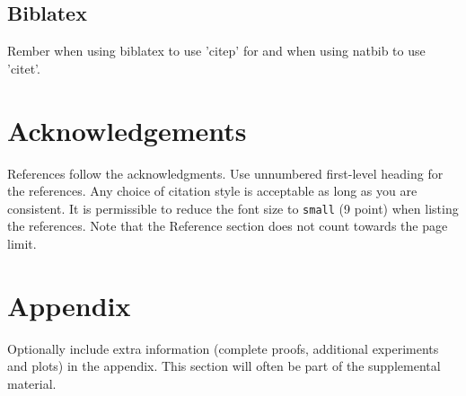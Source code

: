 \documentclass{article}
\begin{document}
\begin{table}[h]
    \centering
    
\end{table}

\subsection{Biblatex}
Rember when using biblatex to use 'citep' for \parencite{kamtheDataEfficient2018} and when using natbib to use 'citet'.


\section*{Acknowledgements}

\small
\printbibliography
\normalsize

References follow the acknowledgments. Use unnumbered first-level heading for
the references. Any choice of citation style is acceptable as long as you are
consistent. It is permissible to reduce the font size to \verb+small+ (9 point)
when listing the references.
Note that the Reference section does not count towards the page limit.
\medskip



\appendix

\section{Appendix}

Optionally include extra information (complete proofs, additional experiments and plots) in the appendix.
This section will often be part of the supplemental material.
\end{document}
